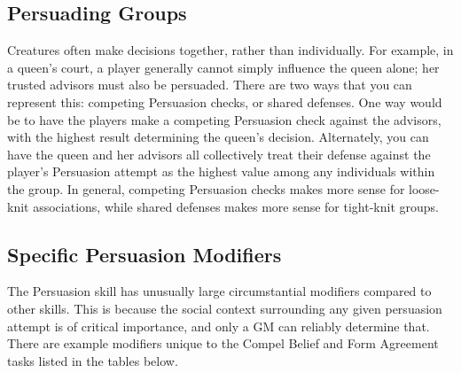   \subsection{Persuading Groups}
    Creatures often make decisions together, rather than individually.
    For example, in a queen's court, a player generally cannot simply influence the queen alone; her trusted advisors must also be persuaded.
    There are two ways that you can represent this: competing Persuasion checks, or shared defenses.
    One way would be to have the players make a competing Persuasion check against the advisors, with the highest result determining the queen's decision.
    Alternately, you can have the queen and her advisors all collectively treat their defense against the player's Persuasion attempt as the highest value among any individuals within the group.
    In general, competing Persuasion checks makes more sense for loose-knit associations, while shared defenses makes more sense for tight-knit groups.

  \subsection{Specific Persuasion Modifiers}
    The Persuasion skill has unusually large circumstantial modifiers compared to other skills.
    This is because the social context surrounding any given persuasion attempt is of critical importance, and only a GM can reliably determine that.
    There are example modifiers unique to the Compel Belief and Form Agreement tasks listed in the tables below.

